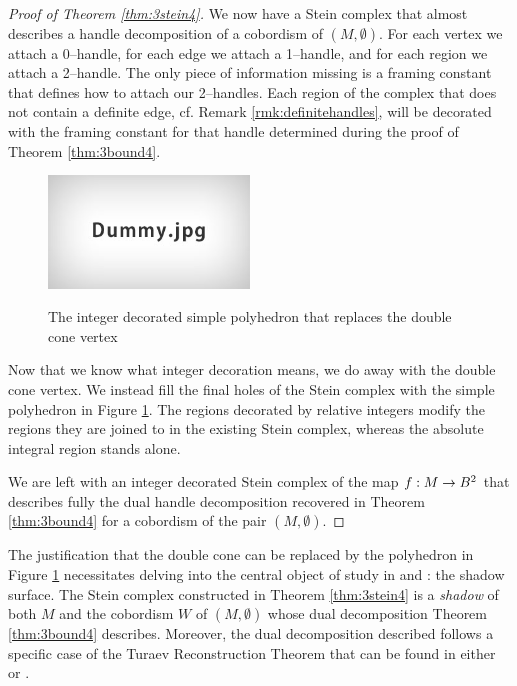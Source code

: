 \begin{proof}[Proof of Theorem \ref{thm:3stein4}]
	We now have a Stein complex that almost describes a handle decomposition of a cobordism of $(M,\emptyset)$.
	For each vertex we attach a 0--handle, for each edge we attach a 1--handle, and for each region we attach a 2--handle.
	The only piece of information missing is a framing constant that defines how to attach our 2--handles.
	Each region of the complex that does not contain a definite edge, cf. Remark \ref{rmk:definitehandles}, will be decorated with the framing constant for that handle determined during the proof of Theorem \ref{thm:3bound4}.
	
	\begin{figure}
		\centering
		\captionsetup{justification=centering}
		\caption{The integer decorated simple polyhedron that replaces the double cone vertex}
		\includegraphics[height=3cm]{figures/dummy.jpg}
		\label{fig:simplepoly}
	\end{figure}
	
	Now that we know what integer decoration means, we do away with the double cone vertex.
	We instead fill the final holes of the Stein complex with the simple polyhedron in Figure \ref{fig:simplepoly}.
	The regions decorated by relative integers modify the regions they are joined to in the existing Stein complex, whereas the absolute integral region stands alone.	  
	
	We are left with an integer decorated Stein complex of the map $f:M\to B^2$ that describes fully the dual handle decomposition recovered in Theorem \ref{thm:3bound4} for a cobordism of the pair $(M,\emptyset)$.
\end{proof}

\begin{rmk}
	The justification that the double cone can be replaced by the polyhedron in Figure \ref{fig:simplepoly} necessitates delving into the central object of study in \cite{CostThur08} and \cite{Turaev91}: the shadow surface.
	The Stein complex constructed in Theorem \ref{thm:3stein4} is a \emph{shadow} of both $M$ and the cobordism $W$ of $(M,\emptyset)$ whose dual decomposition Theorem \ref{thm:3bound4} describes.
	Moreover, the dual decomposition described follows a specific case of the Turaev Reconstruction Theorem that can be found in either \cite{CostThur08} or \cite{Turaev91}.
\end{rmk}
